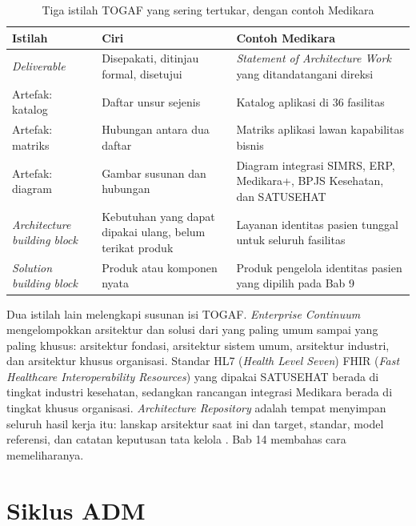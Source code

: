 \begin{table}[!htb]
  \centering
  \caption{Tiga istilah TOGAF yang sering tertukar, dengan contoh Medikara}
  \label{tab:ch02-tiga-istilah}
  {\footnotesize
  \begin{tabularx}{\textwidth}{>{\raggedright\arraybackslash}p{2.6cm}
                               >{\raggedright\arraybackslash}p{3.8cm}
                               >{\raggedright\arraybackslash}X}
    \hline
    \textbf{Istilah} & \textbf{Ciri} & \textbf{Contoh Medikara} \\
    \hline
    \textit{Deliverable} & Disepakati, ditinjau formal, disetujui & \textit{Statement of Architecture Work} yang ditandatangani direksi \\
    \hline
    Artefak: katalog & Daftar unsur sejenis & Katalog aplikasi di 36 fasilitas \\
    \hline
    Artefak: matriks & Hubungan antara dua daftar & Matriks aplikasi lawan kapabilitas bisnis \\
    \hline
    Artefak: diagram & Gambar susunan dan hubungan & Diagram integrasi SIMRS, ERP, Medikara+, BPJS Kesehatan, dan SATUSEHAT \\
    \hline
    \textit{Architecture building block} & Kebutuhan yang dapat dipakai ulang, belum terikat produk & Layanan identitas pasien tunggal untuk seluruh fasilitas \\
    \hline
    \textit{Solution building block} & Produk atau komponen nyata & Produk pengelola identitas pasien yang dipilih pada Bab 9 \\
    \hline
  \end{tabularx}}
\end{table}

Dua istilah lain melengkapi susunan isi TOGAF. \textit{Enterprise
Continuum} mengelompokkan arsitektur dan solusi dari yang paling umum sampai
yang paling khusus: arsitektur fondasi, arsitektur sistem umum, arsitektur
industri, dan arsitektur khusus organisasi. Standar HL7 (\textit{Health
Level Seven}) FHIR (\textit{Fast Healthcare Interoperability Resources}) yang
dipakai SATUSEHAT berada di tingkat industri kesehatan, sedangkan rancangan
integrasi Medikara berada di tingkat khusus organisasi. \textit{Architecture
Repository} adalah tempat menyimpan seluruh hasil kerja itu: lanskap
arsitektur saat ini dan target, standar, model referensi, dan catatan
keputusan tata kelola \cite{togaf10}. Bab 14 membahas cara memeliharanya.

\section{Siklus ADM}


